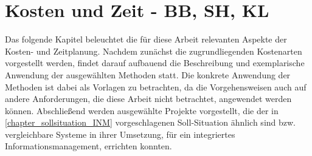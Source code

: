 
\chapter{Kosten und Zeit - BB, SH, KL}

Das folgende Kapitel beleuchtet die für diese Arbeit relevanten Aspekte der Kosten- und Zeitplanung. Nachdem zunächst die zugrundliegenden Kostenarten vorgestellt werden, findet darauf aufbauend die Beschreibung und exemplarische Anwendung der ausgewählten Methoden statt. Die konkrete Anwendung der Methoden ist dabei als Vorlagen zu betrachten, da die Vorgehensweisen auch auf andere Anforderungen, die diese Arbeit nicht betrachtet, angewendet werden k\"onnen. Abschließend werden ausgew\"ahlte Projekte vorgestellt, die der in \ref{chapter_sollsituation_INM} vorgeschlagenen Soll-Situation \"ahnlich sind bzw. vergleichbare Systeme in ihrer Umsetzung, f\"ur ein integriertes Informationsmanagement, errichten konnten.





\clearpage

